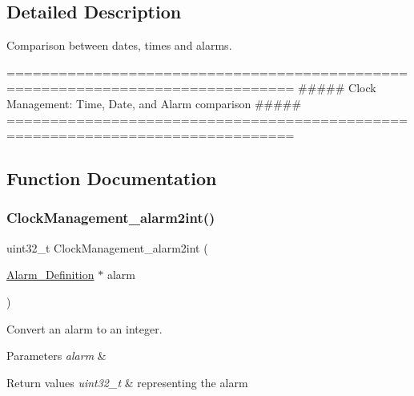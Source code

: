 \subsection{Detailed Description}
Comparison between dates, times and alarms. 

\begin{DoxyVerb}===============================================================================
       ##### Clock Management: Time, Date, and Alarm comparison #####
===============================================================================
\end{DoxyVerb}
 

\subsection{Function Documentation}
\mbox{\label{group___clock___management___alarm_comp_ga6e567ef31c1220b3440ca3f726f86d10}} 
\subsubsection{\texorpdfstring{Clock\+Management\+\_\+alarm2int()}{ClockManagement\_alarm2int()}}
{\footnotesize\ttfamily uint32\+\_\+t Clock\+Management\+\_\+alarm2int (\begin{DoxyParamCaption}\item[{\hyperlink{struct_alarm___definition}{Alarm\+\_\+\+Definition} $\ast$}]{alarm }\end{DoxyParamCaption})}



Convert an alarm to an integer. 


\begin{DoxyParams}{Parameters}
{\em alarm} & \\
\hline
\end{DoxyParams}

\begin{DoxyRetVals}{Return values}
{\em uint32\+\_\+t} & representing the alarm \\
\hline
\end{DoxyRetVals}
\mbox{\label{group___clock___management___alarm_comp_ga9e3b465b980b97aa4477ac3574b5cfba}} 
